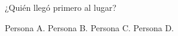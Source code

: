 ¿Quién llegó primero al lugar?

\begin{choices}
    \CorrectChoice  Persona A.
    \choice         Persona B.
    \choice         Persona C.
    \choice         Persona D.
\end{choices}